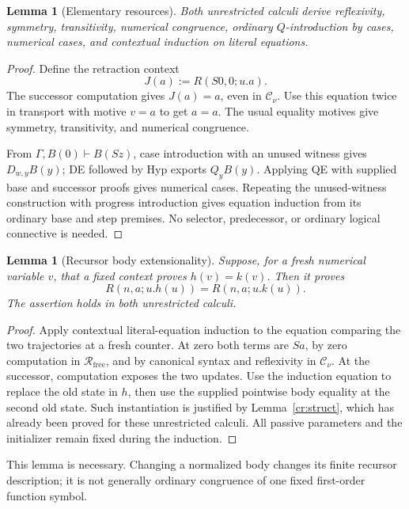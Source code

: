 \documentclass[11pt]{article}
\newtheorem{lemma}[theorem]{Lemma}
\theoremstyle{definition}
\newcommand{\Rfree}{\mathcal R_{\mathrm{free}}}
\newcommand{\Cnorm}{\mathcal C_\nu}
\begin{document}
\begin{lemma}[Elementary resources]\label{cr:resources}
Both unrestricted calculi derive reflexivity, symmetry, transitivity, numerical congruence, ordinary \(Q\)-introduction by cases, numerical cases, and contextual induction on literal equations.
\end{lemma}
\begin{proof}
Define the retraction context
\[
J(a):=R(S0,0;u.a).
\]
The successor computation gives \(J(a)=a\), even in \(\Cnorm\). Use this equation twice in transport with motive \(v=a\) to get \(a=a\). The usual equality motives give symmetry, transitivity, and numerical congruence.

From \(\Gamma,B(0)\vdash B(Sz)\), case introduction with an unused witness gives \(D_{w,y}B(y)\); DE followed by Hyp exports \(Q_yB(y)\). Applying QE with supplied base and successor proofs gives numerical cases. Repeating the unused-witness construction with progress introduction gives equation induction from its ordinary base and step premises. No selector, predecessor, or ordinary logical connective is needed.
\end{proof}

\begin{lemma}[Recursor body extensionality]\label{cr:body}
Suppose, for a fresh numerical variable \(v\), that a fixed context proves \(h(v)=k(v)\). Then it proves
\[
R(n,a;u.h(u))=R(n,a;u.k(u)).
\]
The assertion holds in both unrestricted calculi.
\end{lemma}
\begin{proof}
Apply contextual literal-equation induction to the equation comparing the two trajectories at a fresh counter. At zero both terms are \(Sa\), by zero computation in \(\Rfree\), and by canonical syntax and reflexivity in \(\Cnorm\). At the successor, computation exposes the two updates. Use the induction equation to replace the old state in \(h\), then use the supplied pointwise body equality at the second old state. Such instantiation is justified by Lemma~\ref{cr:struct}, which has already been proved for these unrestricted calculi. All passive parameters and the initializer remain fixed during the induction.
\end{proof}

This lemma is necessary. Changing a normalized body changes its finite recursor description; it is not generally ordinary congruence of one fixed first-order function symbol.
\end{document}
